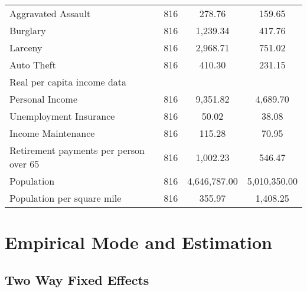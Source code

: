 \documentclass{article}
\begin{document}
\begin{table}[h]
\begin{tabular}[t]{@{\extracolsep{5pt}}lccc}
\hspace{3mm}Aggravated Assault & 816 & 278.76 & 159.65 \\ 
\hspace{3mm}Burglary & 816 & 1,239.34 & 417.76 \\ 
\hspace{3mm}Larceny & 816 & 2,968.71 & 751.02 \\ 
\hspace{3mm}Auto Theft & 816 & 410.30 & 231.15 \\ 
Real per capita income data &&&\\
\hspace{3mm}Personal Income & 816 & 9,351.82 & 4,689.70 \\ 
\hspace{3mm}Unemployment Insurance & 816 & 50.02 & 38.08 \\ 
\hspace{3mm}Income Maintenance & 816 & 115.28 & 70.95 \\ 
\hspace{3mm}Retirement payments per person over 65 & 816 & 1,002.23 & 546.47 \\ 
Population & 816 & 4,646,787.00 & 5,010,350.00 \\ 
Population per square mile & 816 & 355.97 & 1,408.25 \\ 
\bottomrule
\end{tabular} 
\end{table} 
\section*{Empirical Mode and Estimation}
\subsection*{Two Way Fixed Effects}
\end{document}
